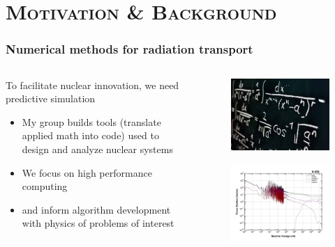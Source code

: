 \documentclass[xcolor=x11names,compress,handout]{beamer}
\renewcommand{\(}{\begin{columns}}
\renewcommand{\)}{\end{columns}}
\newcommand{\<}[1]{\begin{column}{#1}}
\renewcommand{\>}{\end{column}}
\begin{document}
\section{\scshape Motivation \& Background}
\begin{frame}[fragile]
  \frametitle{Numerical methods for radiation transport}

\begin{columns}
  \begin{column}{0.55\textwidth}
  To facilitate nuclear innovation, 
we need predictive simulation
	\begin{itemize}
	\item My group builds tools (translate applied math into code) used to design and analyze nuclear systems
	\item We focus on high performance computing
	\item and inform algorithm development with physics of problems of interest
	\end{itemize}
  \end{column}
  \begin{column}{0.45\textwidth}
  	\begin{figure}
  	\begin{center}
  		\includegraphics[height=1.in,clip]{../figs/applied-math}\\
		\includegraphics[height=1.5in,clip]{../figs/u235-xsecs}
	\end{center}
  	\end{figure}
  \end{column}
\end{columns}

\end{frame}
\end{document}
